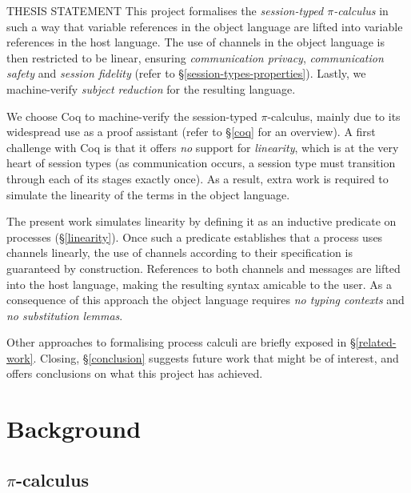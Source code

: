 \documentclass{mproj}
\newcommand{\picalc}{$\pi$-calculus}
\begin{document}
\begin{thesis-statement}{THESIS STATEMENT}
    This project formalises the \emph{session-typed \picalc{}} in such a way that variable references in the object language are lifted into variable references in the host language. The use of channels in the object language is then restricted to be linear, ensuring \emph{communication privacy}, \emph{communication safety} and \emph{session fidelity} (refer to \S \ref{session-types-properties}). Lastly, we machine-verify \emph{subject reduction} for the resulting language.
\end{thesis-statement}


We choose Coq \cite{Coquand1989, CoqDeveloperCommunity} to machine-verify the session-typed \picalc{}, mainly due to its widespread use as a proof assistant (refer to \S \ref{coq} for an overview). A first challenge with Coq is that it offers \emph{no} support for \emph{linearity}, which is at the very heart of session types (as communication occurs, a session type must transition through each of its stages exactly once). As a result, extra work is required to simulate the linearity of the terms in the object language.

The present work simulates linearity by defining it as an inductive predicate on processes (\S \ref{linearity}). Once such a predicate establishes that a process uses channels linearly, the use of channels according to their specification is guaranteed by construction. References to both channels and messages are lifted into the host language, making the resulting syntax amicable to the user. As a consequence of this approach the object language requires \emph{no typing contexts} and \emph{no substitution lemmas}.

Other approaches to formalising process calculi are briefly exposed in \S \ref{related-work}. Closing, \S \ref{conclusion} suggests future work that might be of interest, and offers conclusions on what this project has achieved.

\chapter{Background}

\section{\picalc}\label{pi-calculus}
\end{document}
